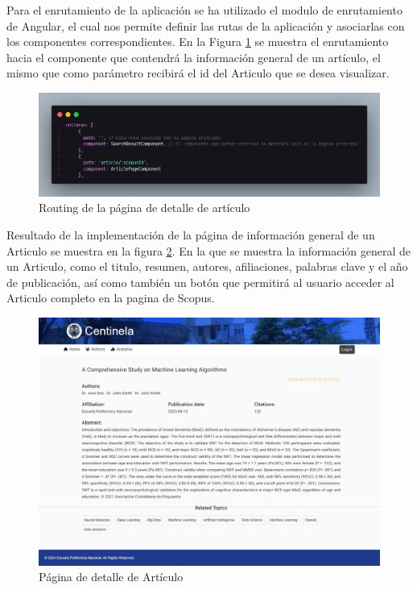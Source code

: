Para el enrutamiento de la aplicación se ha utilizado el modulo de enrutamiento de Angular, el cual nos permite definir las rutas de la aplicación y asociarlas con los componentes correspondientes.
En la Figura \ref{fig:enrutamiento-article-page} se muestra el enrutamiento hacia el componente que contendrá la información general de un artículo, el mismo que como parámetro recibirá el id del Articulo que se desea visualizar.
\begin{figure}[H]
    \centering
    \includegraphics[scale=0.2]{../02Figures/02Chapter/Sprints/Sprint-1/enrutamiento-article-page.png}
    \caption{Routing de la página de detalle de artículo}
    \label{fig:enrutamiento-article-page}
\end{figure}

Resultado de la implementación de la página de información general de un Articulo se muestra en la figura \ref{fig:article-page}.
En la que se muestra la información general de un Articulo, como el titulo, resumen, autores, afiliaciones, palabras clave y el año de publicación, así como también un botón que permitirá al usuario acceder al Articulo completo en la pagina de Scopus.

\begin{figure}[H]
    \centering
    \includegraphics[scale=0.160]{../02Figures/02Chapter/Sprints/Sprint-1/article-page.jpeg}
    \caption{Página de detalle de Artículo}
    \label{fig:article-page}
\end{figure}

